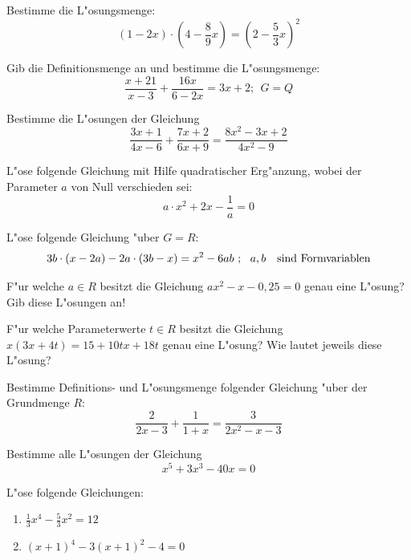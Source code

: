 \documentclass[a4paper, twoside, parskip, 10pt, smallheadings]{scrbook}
\theoremstyle{plain}
\theoremstyle{definition}
\begin{document}
Bestimme die L"osungsmenge:
\[(1-2x)\cdot \left(4-\frac{8}{9}x\right)=\left(2-\frac{5}{3}x\right)^2\]

\item
 

Gib die Definitionsmenge an und bestimme die L"osungsmenge:
$$
\frac{x+21}{x-3} + \frac{16x}{6-2x} = 3x + 2; \ \ G= Q
$$
  

\item

Bestimme die L"osungen der Gleichung
\[\frac{3x+1}{4x-6}+\frac{7x+2}{6x+9}=\frac{8x^2-3x+2}{4x^2-9}\]

\item

L"ose folgende Gleichung mit Hilfe quadratischer Erg"anzung, wobei der
Parameter $a$ von Null verschieden sei:
\[a\cdot x^2+2x-\frac{1}{a}=0\]



\item
 

L"ose folgende Gleichung "uber $G=R$:
\[3b\cdot (x-2a)-2a\cdot (3b-x)=x^2-6ab~;~~a,b \quad{\rm sind~ Formvariablen}\]


\item
 
F"ur welche $a \in R$ besitzt die Gleichung $ ax^2 - x - 0,25 = 0$ 
genau eine L"osung? Gib diese L"osungen an!\\


\item
 
F"ur welche Parameterwerte $t \in R$ besitzt die Gleichung $x(3x + 4t) = 15 + 10tx + 18t$
genau eine L"osung? Wie lautet jeweils diese L"osung?\\


\item
 
Bestimme Definitions- und L"osungsmenge folgender Gleichung "uber der 
Grundmenge $R$:
$$\frac{2}{2x-3} + \frac{1}{1+x}=\frac{3}{2x^2-x-3}$$


\item
 

Bestimme alle L"osungen der Gleichung 
\[x^5+3x^3-40x=0\]


\item
 
L"ose folgende Gleichungen:
\begin{enumerate}
\item
$\frac{1}{3} x^4 - \frac{5}{3} x^2 = 12$
\item
$(x+1)^4 - 3 (x+1)^2 - 4 = 0$
\end{enumerate}
\end{document}
